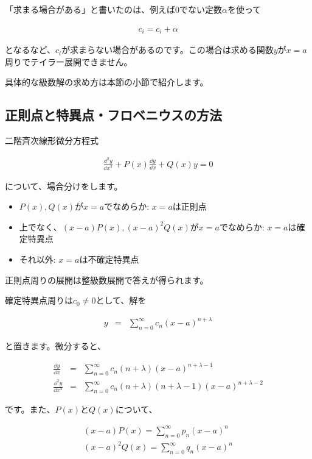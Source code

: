「求まる場合がある」と書いたのは、例えば0でない定数$\alpha$を使って

\begin{eqnarray}
c_i=c_i+\alpha
\end{eqnarray}

\noindent
となるなど、$c_i$が求まらない場合があるのです。この場合は求める関数$y$が$x=a$周りでテイラー展開できません。

具体的な級数解の求め方は本節の小節で紹介します。








\subsection{正則点と特異点・フロベニウスの方法}
\label{regular-singular}
二階斉次線形微分方程式

\begin{eqnarray}
    \frac{\dd^2 y}{\dd x^2}+P(x)\frac{\dd y}{\dd x}+Q(x)y=0
\end{eqnarray}

\noindent
について、場合分けをします。

\begin{itemize}
    \item $P(x),Q(x)$が$x=a$でなめらか: $x=a$は正則点
    \item 上でなく、$(x-a)P(x),(x-a)^2Q(x)$が$x=a$でなめらか: $x=a$は確定特異点
    \item それ以外: $x=a$は不確定特異点
\end{itemize}

正則点周りの展開は整級数展開で答えが得られます。

確定特異点周りは$c_0\neq0$として、解を

\begin{eqnarray}
    y&=&\sum_{n=0}^\infty c_n(x-a)^{n+\lambda}
\end{eqnarray}

\noindent
と置きます。微分すると、

\begin{eqnarray}
    \frac{\dd y}{\dd x}&=&\sum_{n=0}^\infty c_n(n+\lambda)(x-a)^{n+\lambda-1} \\
    \frac{\dd^2 y}{\dd x^2}&=&\sum_{n=0}^\infty c_n(n+\lambda)(n+\lambda-1)(x-a)^{n+\lambda-2}
\end{eqnarray}

\noindent
です。また、$P(x)$と$Q(x)$について、

\begin{eqnarray}
    (x-a)P(x)=\sum_{n=0}^\infty p_n(x-a)^n \\
    (x-a)^2Q(x)=\sum_{n=0}^\infty q_n(x-a)^n
\end{eqnarray}

